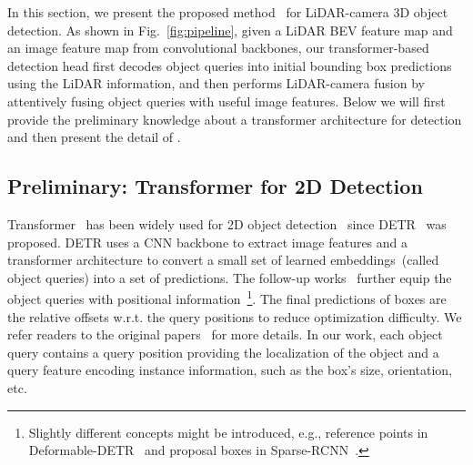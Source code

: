 
In this section, we present the proposed method \Name~for LiDAR-camera 3D object detection. As shown in Fig.~\ref{fig:pipeline}, given {a} LiDAR BEV feature map and {an} image feature map from convolutional backbones,
{our transformer-based detection head first decodes object queries into initial bounding box predictions using the LiDAR information, and then performs LiDAR-camera fusion by attentively fusing object queries with useful image features.}
Below we will first provide the preliminary knowledge about a transformer architecture for detection and then present the detail of \Name.









\subsection{Preliminary: Transformer for {2D} Detection}
Transformer~\cite{Vaswani2017AttentionIA} has been widely used for 2D object detection~\cite{Zhu2021DeformableDD, Sun2020SparseRE, Gao2021FastCO, Yao2021EfficientDI} since DETR~\cite{carion2020endtoend} was proposed. 
DETR uses {a} CNN backbone to extract image features and {a} transformer 
architecture to convert a small set of learned embeddings~(called object queries) into a set of predictions. The follow{-}up works~\cite{Zhu2021DeformableDD, Sun2020SparseRE, Yao2021EfficientDI} further equip the object queries with positional information~\footnote{Slightly different concepts might be introduced, e.g., reference points in Deformable-DETR~\cite{Zhu2021DeformableDD} and proposal boxes in Sparse-RCNN~\cite{Sun2020SparseRE}.}. The final predictions of boxes are the relative offsets w.r.t. the query positions to reduce 
optimization difficulty. We refer readers to the original papers~\cite{carion2020endtoend, Zhu2021DeformableDD} for more details. 
{In our work,}
each object query contains {a} query position providing the localization of the object and a query feature
encoding instance information, such as the {box's} size, orientation, etc. 



















